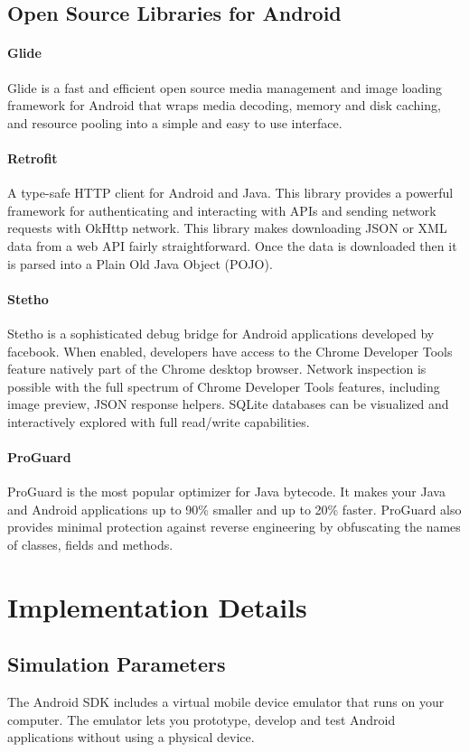 \documentclass[BTech]{srmuthesis}
\begin{document}
\subsection{Open Source Libraries for Android}
\paragraph{Glide}
Glide is a fast and efficient open source media management and image loading framework for Android that wraps media decoding, memory and disk caching, and resource pooling into a simple and easy to use interface.
\paragraph{Retrofit}
A type-safe HTTP client for Android and Java.
This library provides a powerful framework for authenticating and interacting with APIs and sending network requests with OkHttp network.
This library makes downloading JSON or XML data from a web API fairly straightforward. Once the data is downloaded then it is parsed into a Plain Old Java Object (POJO).
\paragraph{Stetho}
Stetho is a sophisticated debug bridge for Android applications developed by facebook. When enabled, developers have access to the Chrome Developer Tools feature natively part of the Chrome desktop browser.
Network inspection is possible with the full spectrum of Chrome Developer Tools features, including image preview, JSON response helpers.
SQLite databases can be visualized and interactively explored with full read/write capabilities.
\paragraph{ProGuard}
ProGuard is the most popular optimizer for Java bytecode. It makes your Java and Android applications up to 90\% smaller and up to 20\% faster. ProGuard also provides minimal protection against reverse engineering by obfuscating the names of classes, fields and methods.
\section{Implementation Details}

\subsection{Simulation Parameters}
The Android SDK includes a virtual mobile device emulator that runs on your computer. The emulator lets you prototype, develop and test Android applications without using a physical device.
\end{document}
